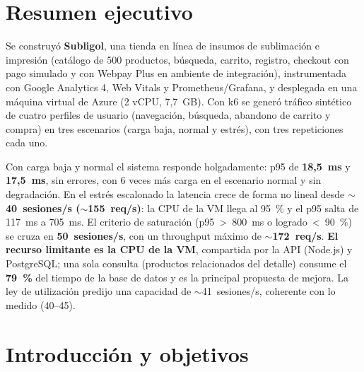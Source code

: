 \documentclass[11pt,a4paper]{article}
\begin{document}
\tableofcontents
\newpage

\section*{Resumen ejecutivo}

\begin{tcolorbox}[enhanced, sharp corners, colback=white, colframe=gristexto,
  boxrule=0pt, toprule=0.4pt, bottomrule=0.4pt, left=0pt, right=0pt, top=8pt, bottom=8pt,
  before upper={\setlength{\parskip}{0.6em}}]
Se construyó \textbf{Subligol}, una tienda en línea de insumos de sublimación e
impresión (catálogo de 500 productos, búsqueda, carrito, registro, checkout con
pago simulado y con Webpay Plus en ambiente de integración), instrumentada con
Google Analytics 4, Web Vitals y Prometheus/Grafana, y desplegada en una máquina
virtual de Azure (2 vCPU, 7,7~GB). Con k6 se generó tráfico sintético de cuatro
perfiles de usuario (navegación, búsqueda, abandono de carrito y compra) en tres
escenarios (carga baja, normal y estrés), con tres repeticiones cada uno.

Con carga baja y normal el sistema responde holgadamente: p95 de
\textbf{18,5~ms} y \textbf{17,5~ms}, sin errores, con 6 veces más carga en el
escenario normal y sin degradación. En el estrés escalonado la latencia crece de
forma no lineal desde \textbf{$\sim$40~sesiones/s ($\sim$155~req/s)}: la CPU de la
VM llega al 95~\% y el p95 salta de 117~ms a 705~ms. El criterio de saturación
(p95~>~800~ms o logrado~<~90~\%) se cruza en \textbf{50~sesiones/s}, con un
throughput máximo de \textbf{$\sim$172~req/s}. \textbf{El recurso limitante es la
CPU de la VM}, compartida por la API (Node.js) y PostgreSQL; una sola consulta
(productos relacionados del detalle) consume el \textbf{79~\%} del tiempo de la
base de datos y es la principal propuesta de mejora. La ley de utilización
predijo una capacidad de $\sim$41~sesiones/s, coherente con lo medido (40--45).
\end{tcolorbox}

\section{Introducción y objetivos}
\end{document}
